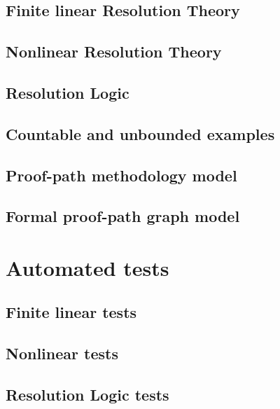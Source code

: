 \documentclass[11pt,oneside]{book}
\theoremstyle{remark}
\begin{document}
\section{Finite linear Resolution Theory}


\section{Nonlinear Resolution Theory}


\section{Resolution Logic}


\section{Countable and unbounded examples}


\section{Proof-path methodology model}


\section{Formal proof-path graph model}


\chapter{Automated tests}
\section{Finite linear tests}

\section{Nonlinear tests}

\section{Resolution Logic tests}

\end{document}
